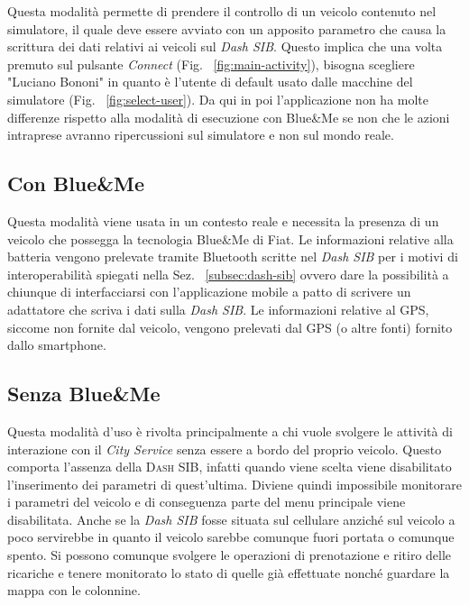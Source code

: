 Questa modalità permette di prendere il controllo di un veicolo contenuto nel simulatore, il quale deve essere avviato con un apposito parametro che causa la scrittura dei dati relativi ai veicoli sul \emph{Dash SIB}. Questo implica che una volta premuto sul pulsante \emph{Connect} (Fig. ~\ref{fig:main-activity}), bisogna scegliere "Luciano Bononi" in quanto è l'utente di default usato dalle macchine del simulatore (Fig. ~\ref{fig:select-user}). Da qui in poi l'applicazione non ha molte differenze rispetto alla modalità di esecuzione con Blue\&{}Me se non che le azioni intraprese avranno ripercussioni sul simulatore e non sul mondo reale.

\subsection{Con Blue\&{}Me}

Questa modalità viene usata in un contesto reale e necessita la presenza di un veicolo che possegga la tecnologia Blue\&{}Me di Fiat. Le informazioni relative alla batteria vengono prelevate tramite Bluetooth scritte nel \emph{Dash SIB} per i motivi di interoperabilità spiegati nella Sez. ~\ref{subsec:dash-sib} ovvero dare la possibilità a chiunque di interfacciarsi con l'applicazione mobile a patto di scrivere un adattatore che scriva i dati sulla \emph{Dash SIB}. Le informazioni relative al GPS, siccome non fornite dal veicolo, vengono prelevati dal GPS (o altre fonti) fornito dallo smartphone.

\subsection{Senza Blue\&{}Me}\label{subsec:noblueme}

Questa modalità d'uso è rivolta principalmente a chi vuole svolgere le attività di interazione con il \emph{City Service} senza essere a bordo del proprio veicolo. Questo comporta l'assenza della \textsc{Dash SIB}, infatti quando viene scelta viene disabilitato l'inserimento dei parametri di quest'ultima. Diviene quindi impossibile monitorare i parametri del veicolo e di conseguenza parte del menu principale viene disabilitata. Anche se la \emph{Dash SIB} fosse situata sul cellulare anziché sul veicolo a poco servirebbe in quanto il veicolo sarebbe comunque fuori portata o comunque spento. Si possono comunque svolgere le operazioni di prenotazione e ritiro delle ricariche e tenere monitorato lo stato di quelle già effettuate nonché guardare la mappa con le colonnine.


